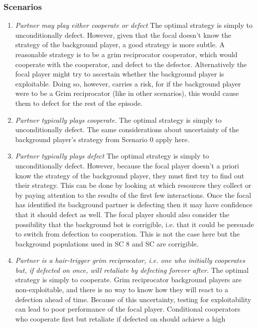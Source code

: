 \documentclass{article} %
\begin{document}
\subsubsection{Scenarios}
\begin{enumerate}
    \item[\textbf{SC0:}] \textit{Partner may play either cooperate or defect}  The optimal strategy is simply to unconditionally defect. However, given that the
focal doesn’t know the strategy of the background player, a good strategy is more subtle. A reasonable strategy is to be a grim
reciprocator cooperator, which would cooperate with the cooperator, and defect to
the defector. Alternatively the focal player
might try to ascertain whether the background player is exploitable. Doing so, however, carries a risk, for if the background
player were to be a Grim reciprocator (like
in other scenarios), this would cause them
to defect for the rest of the episode.
    \item[\textbf{SC1:}] \textit{Partner typically plays cooperate.}  The optimal strategy is simply to unconditionally
defect. The same considerations about uncertainty of the background player’s strategy from Scenario 0 apply here.
    \item[\textbf{SC2:}] \textit{Partner typically plays defect}  The optimal
strategy is simply to unconditionally defect.
However, because the focal player doesn’t a
priori know the strategy of the background
player, they must first try to find out their
strategy. This can be done by looking at
which resources they collect or by paying
attention to the results of the first few interactions. Once the focal has identified
its background partner is defecting then it
may have confidence that it should defect as
well. The focal player should also consider
the possibility that the background bot is
corrigible, i.e. that it could be persuade to
switch from defection to cooperation. This
is not the case here but the background populations used in SC 8 and SC are corrigible.
    \item[\textbf{SC3:}] \textit{Partner is a hair-trigger grim reciprocator, i.e.
one who initially cooperates but, if defected
on once, will retaliate by defecting forever after.}  The optimal strategy is simply to cooperate. Grim reciprocator background players
are non-exploitable, and there is no way
to know how they will react to a defection
ahead of time. Because of this uncertainty,
testing for exploitability can lead to poor
performance of the focal player. Conditional
cooperators who cooperate first but retaliate if defected on should achieve a high

\end{enumerate}
\end{document}
